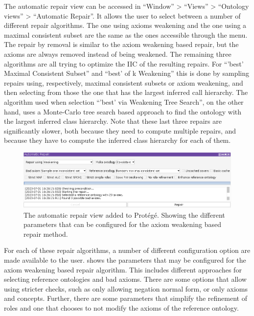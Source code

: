 The automatic repair view can be accessed in ``Window'' > ``Views'' > ``Ontology views'' > ``Automatic Repair''. It allows the user to select between a number of different repair algorithms. The one using axioms weakening and the one using a maximal consistent subset are the same as the ones accessible through the menu. The repair by removal is similar to the axiom weakening based repair, but the axioms are always removed instead of being weakened. The remaining three algorithms are all trying to optimize the IIC of the resulting repairs. For ``'best' Maximal Consistent Subset'' and ``best' of k Weakening'' this is done by sampling repairs using, respectively, maximal consistent subsets or axiom weakening, and then selecting from those the one that has the largest inferred call hierarchy. The algorithm used when selection ``'best' via Weakening Tree Search'', on the other hand, uses a Monte-Carlo tree search based approach to find the ontology with the largest inferred class hierarchy. Note that these last three repairs are significantly slower, both because they need to compute multiple repairs, and because they have to compute the inferred class hierarchy for each of them.

\begin{figure}[htbp]
  \centering
  \includegraphics[width=\textwidth]{resources/protege-guide-config.png}
  \caption{The automatic repair view added to Protégé. Showing the different parameters that can be configured for the axiom weakening based repair method.}
  \label{fig:protege-guide-config}
\end{figure}

For each of these repair algorithms, a number of different configuration option are made available to the user.  shows the parameters that may be configured for the axiom weakening based repair algorithm. This includes different approaches for selecting reference ontologies and bad axioms. There are some options that allow using stricter checks, such as only allowing negation normal form, or only \ALC axioms and concepts. Further, there are some parameters that simplify the refinement of roles and one that chooses to not modify the axioms of the reference ontology.

